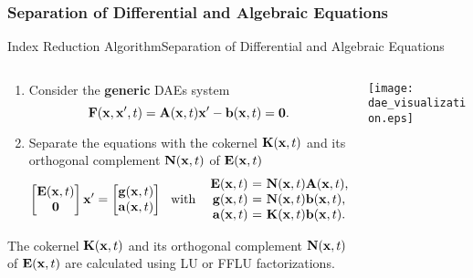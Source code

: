 \subsubsection{Separation of Differential and Algebraic Equations}

\begin{frame}{Index Reduction Algorithm}{Separation of Differential and Algebraic Equations}
  \vspace{-1.0em}
  \begin{columns}
    \begin{column}[c]{0.6\textwidth}
      \begin{enumerate}
        \item Consider the \textbf{generic} \acp{DAE} system
        \begin{equation*}
          \mathbf{F}(\mathbf{x}, \mathbf{x}^\prime, t) = \mathbf{A}(\mathbf{x}, t) \mathbf{x}^\prime - \mathbf{b}(\mathbf{x}, t) = \mathbf{0} \text{.}
        \end{equation*}
        \item Separate the equations with the cokernel $\mathbf{K}(\mathbf{x}, t)$ and its orthogonal complement $\mathbf{N}(\mathbf{x}, t)$ of $\mathbf{E}(\mathbf{x}, t)$%
        \begin{equation*}
          \begin{bmatrix} \mE \\ \m{0} \end{bmatrix} \mxp = \begin{bmatrix} \mg \\ \ma \end{bmatrix}
          ~~ \text{with} ~~
          \begin{array}{r@{~}c@{~}l}
            \mE &=& \mN \mA \text{,} \\
            \mg &=& \mN \mb \text{,} \\
            \ma &=& \mK \mb \text{.}
          \end{array}
        \end{equation*}
      \end{enumerate}
      \begin{bbox}
        The cokernel $\mathbf{K}(\mathbf{x}, t)$ and its orthogonal complement $\mathbf{N}(\mathbf{x}, t)$ of $\mathbf{E}(\mathbf{x}, t)$ are calculated using \ac{LU} or \ac{FFLU} factorizations.
      \end{bbox}
    \end{column}
    \begin{column}[c]{0.4\textwidth}
      \texttt{[image: dae\_visualization.eps]}
    \end{column}
  \end{columns}
\end{frame}

